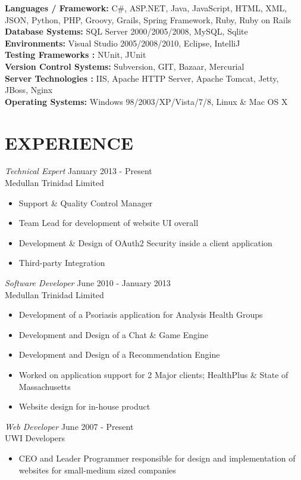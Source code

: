 \documentclass[margin]{res}
\begin{document}
\begin{resume}
{\bf Languages / Framework:} C\#, ASP.NET, Java, JavaScript, HTML, XML, JSON, Python, PHP, Groovy, Grails, Spring Framework, Ruby, Ruby on Rails \\
{\bf Database Systems:} SQL Server 2000/2005/2008, MySQL, Sqlite \\ 
{\bf Environments:} Visual Studio 2005/2008/2010, Eclipse, IntelliJ\\
{\bf Testing Frameworks :} NUnit, JUnit\\
{\bf Version Control Systems:} Subversion, GIT, Bazaar, Mercurial\\ 
{\bf Server Technologies :} IIS, Apache HTTP Server, Apache Tomcat, Jetty, JBoss, Nginx\\
{\bf Operating Systems:} Windows 98/2003/XP/Vista/7/8, Linux \& Mac OS X
 
\section{EXPERIENCE} 

				{\sl Technical Expert } \hfill January 2013 - Present \\
                Medullan Trinidad Limited
                \begin{itemize}
                \item Support \& Quality Control Manager
                \item Team Lead for development of website UI overall
                \item Development \& Design of OAuth2 Security inside a client application
                \item Third-party Integration
                \end{itemize}
				{\sl Software Developer } \hfill June 2010 - January 2013 \\
                Medullan Trinidad Limited
                \begin{itemize}
                \item Development of a Psoriasis application for Analysis Health Groups
                \item Development and Design of a Chat \& Game Engine
                \item Development and Design of a Recommendation Engine
                \item Worked on application support for 2 Major clients; HealthPlus \& State of Massachusetts
                \item Website design for in-house product
                \end{itemize}
                {\sl Web Developer } \hfill            June 2007 - Present \\
                UWI Developers
                 \begin{itemize}  \itemsep -2pt %
                 \item CEO and Leader Programmer responsible for design and implementation of websites for small-medium sized companies
                 \end{itemize} 
                 

\end{resume}
\end{document}
